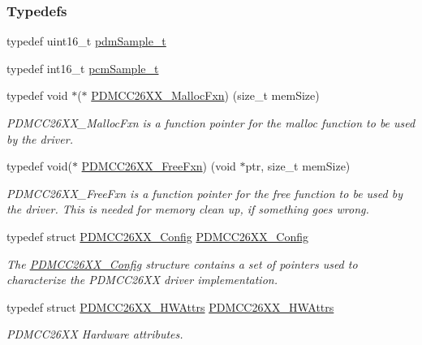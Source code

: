 \subsubsection*{Typedefs}
\begin{DoxyCompactItemize}
\item 
typedef uint16\+\_\+t \hyperlink{_p_d_m_c_c26_x_x_8h_a93dc78b6cc4eec24352aa7e0eedab91d}{pdm\+Sample\+\_\+t}
\item 
typedef int16\+\_\+t \hyperlink{_p_d_m_c_c26_x_x_8h_abc35aab26e130f00d04448b18b60da21}{pcm\+Sample\+\_\+t}
\item 
typedef void $\ast$($\ast$ \hyperlink{_p_d_m_c_c26_x_x_8h_acce02978ce536ea3b98a673587a6e75c}{P\+D\+M\+C\+C26\+X\+X\+\_\+\+Malloc\+Fxn}) (size\+\_\+t mem\+Size)
\begin{DoxyCompactList}\small\item\em P\+D\+M\+C\+C26\+X\+X\+\_\+\+Malloc\+Fxn is a function pointer for the malloc function to be used by the driver. \end{DoxyCompactList}\item 
typedef void($\ast$ \hyperlink{_p_d_m_c_c26_x_x_8h_af95e29fbea1fadfb011e4ceaa36f1ab0}{P\+D\+M\+C\+C26\+X\+X\+\_\+\+Free\+Fxn}) (void $\ast$ptr, size\+\_\+t mem\+Size)
\begin{DoxyCompactList}\small\item\em P\+D\+M\+C\+C26\+X\+X\+\_\+\+Free\+Fxn is a function pointer for the free function to be used by the driver. This is needed for memory clean up, if something goes wrong. \end{DoxyCompactList}\item 
typedef struct \hyperlink{struct_p_d_m_c_c26_x_x___config}{P\+D\+M\+C\+C26\+X\+X\+\_\+\+Config} \hyperlink{_p_d_m_c_c26_x_x_8h_acfb1c3839ec53d02703f67f884760119}{P\+D\+M\+C\+C26\+X\+X\+\_\+\+Config}
\begin{DoxyCompactList}\small\item\em The \hyperlink{struct_p_d_m_c_c26_x_x___config}{P\+D\+M\+C\+C26\+X\+X\+\_\+\+Config} structure contains a set of pointers used to characterize the P\+D\+M\+C\+C26\+X\+X driver implementation. \end{DoxyCompactList}\item 
typedef struct \hyperlink{struct_p_d_m_c_c26_x_x___h_w_attrs}{P\+D\+M\+C\+C26\+X\+X\+\_\+\+H\+W\+Attrs} \hyperlink{_p_d_m_c_c26_x_x_8h_a0188ef7df22961ba87b588d2913e793e}{P\+D\+M\+C\+C26\+X\+X\+\_\+\+H\+W\+Attrs}
\begin{DoxyCompactList}\small\item\em P\+D\+M\+C\+C26\+X\+X Hardware attributes. \end{DoxyCompactList}\item 

\end{DoxyCompactItemize}
